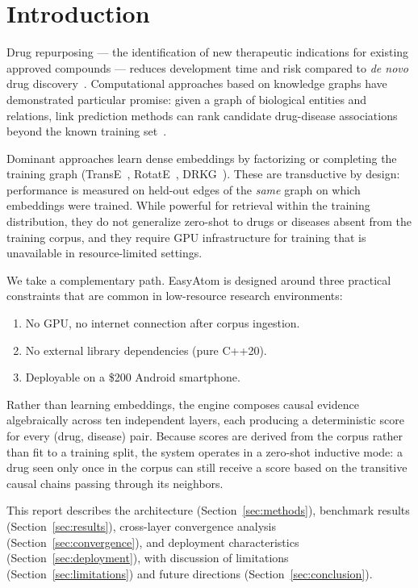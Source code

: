 \documentclass[11pt]{article}
\begin{document}
\section{Introduction}

Drug repurposing — the identification of new therapeutic indications for
existing approved compounds — reduces development time and risk compared
to \emph{de novo} drug discovery~\cite{pushpakom2019drug}.
Computational approaches based on knowledge graphs have demonstrated
particular promise: given a graph of biological entities and relations,
link prediction methods can rank candidate drug-disease associations
beyond the known training set~\cite{nickel2016review}.

Dominant approaches learn dense embeddings by factorizing or completing
the training graph (TransE~\cite{bordes2013translating},
RotatE~\cite{sun2018rotate}, DRKG~\cite{drkg2020}).
These are transductive by design: performance is measured on held-out
edges of the \emph{same} graph on which embeddings were trained.
While powerful for retrieval within the training distribution, they
do not generalize zero-shot to drugs or diseases absent from the
training corpus, and they require GPU infrastructure for training
that is unavailable in resource-limited settings.

We take a complementary path. EasyAtom is designed around three
practical constraints that are common in low-resource research
environments:
\begin{enumerate}[noitemsep]
  \item No GPU, no internet connection after corpus ingestion.
  \item No external library dependencies (pure C++20).
  \item Deployable on a \$200 Android smartphone.
\end{enumerate}

Rather than learning embeddings, the engine composes causal evidence
algebraically across ten independent layers, each producing a
deterministic score for every (drug, disease) pair.
Because scores are derived from the corpus rather than fit to a
training split, the system operates in a zero-shot inductive mode:
a drug seen only once in the corpus can still receive a score based
on the transitive causal chains passing through its neighbors.

This report describes the architecture (Section~\ref{sec:methods}),
benchmark results (Section~\ref{sec:results}), cross-layer convergence
analysis (Section~\ref{sec:convergence}), and deployment characteristics
(Section~\ref{sec:deployment}), with discussion of limitations
(Section~\ref{sec:limitations}) and future directions
(Section~\ref{sec:conclusion}).
\end{document}
